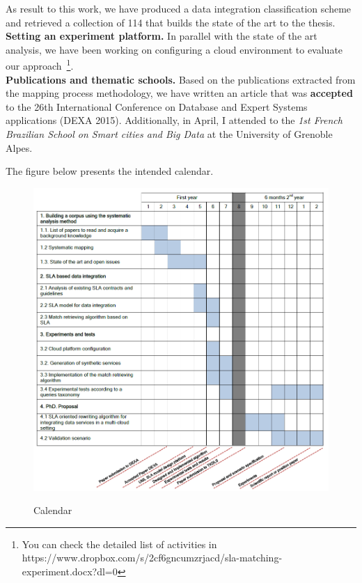 \documentclass[12pt,a4paper,oneside]{report}
\begin{document}
As result to this work, we have produced a data integration classification scheme and retrieved a collection of 114 that builds the state of the art to the thesis.  
\bigskip
\\
\textbf{Setting an experiment platform.}
In parallel with the state of the art analysis, we have been working on configuring a cloud environment to evaluate our approach~\footnote{You can check the detailed list of activities in https://www.dropbox.com/s/2cf6gncumzrjacd/sla-matching-experiment.docx?dl=0}.
%
\bigskip
\\
\textbf{Publications and thematic schools.}
Based on the publications extracted from the mapping process methodology, we have written an article that was \textbf{accepted} to the 26th International Conference on Database and Expert Systems applications (DEXA 2015).
Additionally, in April, I attended to the \emph{1st French Brazilian School on Smart cities and Big Data} at the University of Grenoble Alpes.

\bigskip
The figure below presents the intended calendar. 


\begin{figure}[!h]
\center
\includegraphics[scale=0.65]{calendario.png} \label{fig:calendar} \caption{Calendar}

\end{figure}



\end{document}

